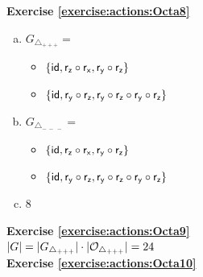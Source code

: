 \noindent\textbf{Exercise \ref{exercise:actions:Octa8}}
\begin{enumerate}[(a)]
\item 
$G_{\triangle_{+ + +}} =$
	\begin{itemize}
	\item
	$\{\sf{id}, r_z \circ r_x, r_y \circ r_z\}$
	
	\item
	$\{\sf{id}, r_y \circ r_z, r_y \circ r_z \circ r_y \circ r_z\}$
	\end{itemize}
	
\item 
$G_{\triangle_{ -~-~-}} =$
	\begin{itemize}
	\item
	$\{\sf{id}, r_z \circ r_x, r_y \circ r_z\}$
	
	\item
	$\{\sf{id}, r_y \circ r_z, r_y \circ r_z \circ r_y \circ r_z\}$
	\end{itemize}
	
\item 
8
\end {enumerate}

\noindent\textbf{Exercise \ref{exercise:actions:Octa9}}
\\
$|G| = |G_{\triangle_{+ + +}}| \cdot |{\cal O}_{\triangle_{+ + +}}| = 24$
\\


\noindent\textbf{Exercise \ref{exercise:actions:Octa10}}
% 
%

